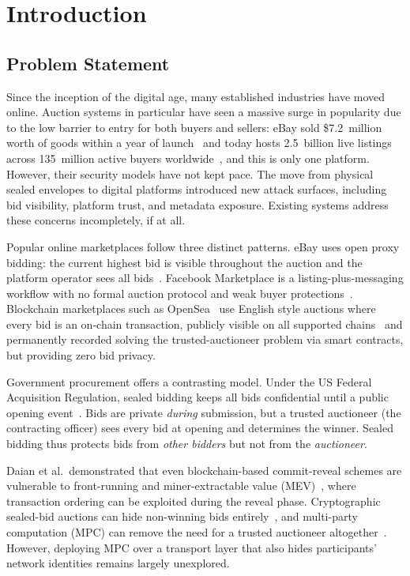 
\section{Introduction}
\label{sec:introduction}

\subsection{Problem Statement}
\label{sec:intro-problem}

Since the inception of the digital age, many established industries have moved
online.  Auction systems in particular have seen a massive surge in popularity
due to the low barrier to entry for both buyers and sellers: eBay sold
\$7.2~million worth of goods within a year of launch~\cite{ebay_history2025}
and today hosts 2.5~billion live listings across 135~million active
buyers worldwide~\cite{ebay_about2025}, and this is only one platform.  However, their
security models have not kept pace.  The move from physical sealed envelopes
to digital platforms introduced new attack surfaces, including bid visibility,
platform trust, and metadata exposure. Existing systems address
these concerns incompletely, if at all.

Popular online marketplaces follow three distinct patterns.  eBay uses open
proxy bidding: the current highest bid is visible throughout the auction and
the platform operator sees all bids~\cite{ebay_help_bidding}.  Facebook
Marketplace is a listing-plus-messaging workflow with no formal auction
protocol and weak buyer protections~\cite{fb_marketplace_help}.  Blockchain
marketplaces such as OpenSea~\cite{opensea2025} use English style auctions where
every bid is an on-chain transaction, publicly visible on all supported
chains~\cite{opensea_chains2025} and permanently recorded solving the
trusted-auctioneer problem via smart contracts, but providing zero bid privacy.

Government procurement offers a contrasting model.  Under the US Federal
Acquisition Regulation, sealed bidding keeps all bids confidential until a
public opening event~\cite{far_part14}.  Bids are private \emph{during}
submission, but a trusted auctioneer (the contracting officer) sees every bid
at opening and determines the winner.  Sealed bidding thus protects bids from
\emph{other bidders} but not from the \emph{auctioneer}.

Daian et al.\ demonstrated that even blockchain-based commit-reveal schemes
are vulnerable to front-running and miner-extractable value
(MEV)~\cite{daian2019_flashboys2}, where transaction ordering can be
exploited during the reveal phase.  Cryptographic sealed-bid auctions can
hide non-winning bids entirely~\cite{sako2000_hide_losers}, and multi-party
computation (MPC) can remove the need for a trusted auctioneer
altogether~\cite{bogetoft2009_mpc_live}.  However, deploying MPC over a
transport layer that also hides participants' network identities remains
largely unexplored.

